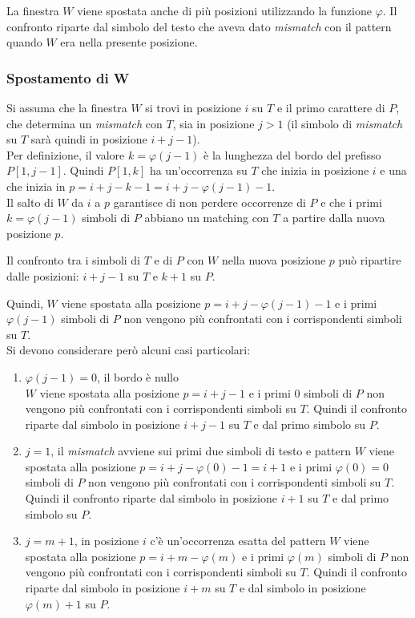 La finestra $W$ viene spostata anche di più posizioni utilizzando la funzione $\varphi$.
Il confronto riparte dal simbolo del testo che aveva dato \textit{mismatch} con il pattern quando $W$ era nella presente posizione.

\subsubsection{Spostamento di W}
Si assuma che la finestra $W$ si trovi in posizione $i$ su $T$ e il primo carattere di $P$, che determina un \textit{mismatch} con $T$, sia in posizione $j>1$ (il simbolo di \textit{mismatch} su $T$ sarà quindi in posizione $i+j-1$).\\
Per definizione, il valore $k = \varphi(j-1)$ è la lunghezza del bordo del prefisso $P[1, j-1]$. Quindi $P[1,k]$ ha un’occorrenza su $T$ che inizia in posizione $i$ e una che inizia in $p=i+j-k-1 = i + j - \varphi(j-1) - 1$.\\

Il salto di $W$ da $i$ a $p$ garantisce di non perdere occorrenze di $P$ e che i primi $k = \varphi(j-1)$ simboli di $P$ abbiano un matching con $T$ a partire dalla nuova posizione $p$.

Il confronto tra i simboli di $T$ e di $P$ con $W$ nella nuova posizione $p$ può ripartire dalle posizioni: $i+j-1$ su $T$ e $k+1$ su $P$.

Quindi, $W$ viene spostata alla posizione $p = i+j-\varphi(j-1) -1$ e i primi $\varphi(j-1)$ simboli di $P$ non vengono più confrontati con i corrispondenti simboli su $T$.\\

Si devono considerare però alcuni casi particolari:
\begin{enumerate}
    \item $\varphi(j-1)=0$, il bordo è nullo \\
        $W$ viene spostata alla posizione $p = i+j-1$ e i primi $0$ simboli di $P$ non vengono più confrontati con i corrispondenti simboli su $T$.
        Quindi il confronto riparte dal simbolo in posizione $i+j-1$ su $T$ e dal primo simbolo su $P$.
    \item $j=1$, il \textit{mismatch} avviene sui primi due simboli di testo e pattern
        $W$ viene spostata alla posizione $p = i+j-\varphi(0) -1 = i + 1$ e i primi $\varphi(0) = 0$ simboli di $P$ non vengono più confrontati con i corrispondenti simboli su $T$. Quindi il confronto riparte dal simbolo in posizione $i+1$ su $T$ e dal primo simbolo su $P$.
    \item $j = m+1$, in posizione $i$ c’è un’occorrenza esatta del pattern
        $W$ viene spostata alla posizione $p = i+m-\varphi(m)$ e i primi $\varphi(m)$ simboli di $P$ non vengono più confrontati con i corrispondenti simboli su $T$. Quindi il confronto riparte dal simbolo in posizione $i+m$ su $T$ e dal simbolo in posizione $\varphi(m) + 1$ su $P$.
\end{enumerate}


